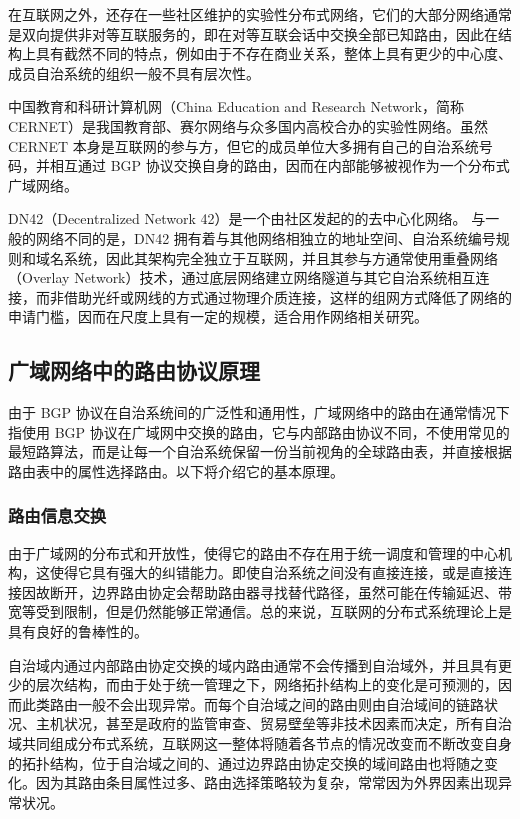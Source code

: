 在互联网之外，还存在一些社区维护的实验性分布式网络，它们的大部分网络通常是双向提供非对等互联服务的，即在对等互联会话中交换全部已知路由，因此在结构上具有截然不同的特点，例如由于不存在商业关系，整体上具有更少的中心度、成员自治系统的组织一般不具有层次性。

中国教育和科研计算机网（China Education and Research Network，简称 CERNET）是我国教育部、赛尔网络与众多国内高校合办的实验性网络。虽然 CERNET 本身是互联网的参与方，但它的成员单位大多拥有自己的自治系统号码，并相互通过 BGP 协议交换自身的路由，因而在内部能够被视作为一个分布式广域网络。

DN42（Decentralized Network 42）是一个由社区发起的的去中心化网络。 与一般的网络不同的是，DN42 拥有着与其他网络相独立的地址空间、自治系统编号规则和域名系统，因此其架构完全独立于互联网，并且其参与方通常使用重叠网络（Overlay Network）技术，通过底层网络建立网络隧道与其它自治系统相互连接，而非借助光纤或网线的方式通过物理介质连接，这样的组网方式降低了网络的申请门槛，因而在尺度上具有一定的规模，适合用作网络相关研究。

\subsection{广域网络中的路由协议原理}

由于 BGP 协议在自治系统间的广泛性和通用性，广域网络中的路由在通常情况下指使用 BGP 协议在广域网中交换的路由，它与内部路由协议不同，不使用常见的最短路算法，而是让每一个自治系统保留一份当前视角的全球路由表，并直接根据路由表中的属性选择路由。以下将介绍它的基本原理。

\subsubsection{路由信息交换}

由于广域网的分布式和开放性，使得它的路由不存在用于统一调度和管理的中心机构，这使得它具有强大的纠错能力。即使自治系统之间没有直接连接，或是直接连接因故断开，边界路由协定会帮助路由器寻找替代路径，虽然可能在传输延迟、带宽等受到限制，但是仍然能够正常通信。总的来说，互联网的分布式系统理论上是具有良好的鲁棒性的。

自治域内通过内部路由协定交换的域内路由通常不会传播到自治域外，并且具有更少的层次结构，而由于处于统一管理之下，网络拓扑结构上的变化是可预测的，因而此类路由一般不会出现异常。而每个自治域之间的路由则由自治域间的链路状况、主机状况，甚至是政府的监管审查、贸易壁垒等非技术因素而决定，所有自治域共同组成分布式系统，互联网这一整体将随着各节点的情况改变而不断改变自身的拓扑结构，位于自治域之间的、通过边界路由协定交换的域间路由也将随之变化。因为其路由条目属性过多、路由选择策略较为复杂，常常因为外界因素出现异常状况。

